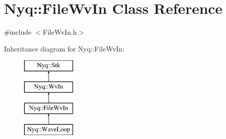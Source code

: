 \hypertarget{class_nyq_1_1_file_wv_in}{}\section{Nyq\+:\+:File\+Wv\+In Class Reference}
\label{class_nyq_1_1_file_wv_in}


{\ttfamily \#include $<$File\+Wv\+In.\+h$>$}

Inheritance diagram for Nyq\+:\+:File\+Wv\+In\+:\begin{figure}[H]
\begin{center}
\leavevmode
\includegraphics[height=4.000000cm]{class_nyq_1_1_file_wv_in}
\end{center}
\end{figure}
